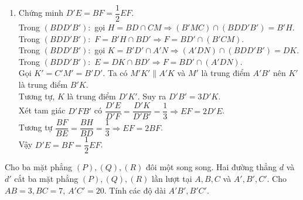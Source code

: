 \begin{bt}
{\begin{enumerate}
{
			}
			\item Chứng minh $D'E=BF=\dfrac{1}{2}EF$.\\
			Trong $(BDD'B')\colon$ gọi $H=BD\cap CM\Rightarrow (B'MC)\cap (BDD'B')=B'H$.\\
			Trong $(BDD'B')\colon$ $F=B'H\cap BD'\Rightarrow F=BD'\cap (B'CM)$.\\
			Trong $(BDD'B')\colon$ gọi $K=B'D'\cap A'N\Rightarrow (A'DN)\cap (BDD'B')=DK$.\\
			Trong $(BDD'B')\colon$ $E=DK\cap BD'\Rightarrow F=BD'\cap (A'DN)$.\\
			Gọi $K'=C'M'=B'D'$. Ta có $M'K'\parallel A'K$ và $M'$ là trung điểm $A'B'$ nên $K'$ là trung điểm $B'K$.\\
			Tương tự, $K$ là trung điểm $D'K'$. Suy ra $D'B'=3D'K$.\\
			Xét tam giác $D'FB'$ có $\dfrac{D'E}{D'F}=\dfrac{D'K}{D'B'}=\dfrac{1}{3}\Rightarrow EF=2D'E$.\\
			Tương tự $\dfrac{BF}{BE}=\dfrac{BH}{BD}=\dfrac{1}{3}\Rightarrow EF=2BF$.\\
			Vậy $D'E=BF=\dfrac{1}{2}EF$.
		\end{enumerate}
	}
\end{bt}

\begin{bt}%
	Cho ba mặt phẳng $(P),(Q),(R)$ đôi một song song. Hai đường thẳng $d$ và $d'$ cắt ba mặt phẳng $(P),(Q),(R)$ lần lượt tại $A, B, C$ và $A', B', C'$. Cho $A B=3, B C=7$, $A' C'=20$. Tính các độ dài $A' B', B' C'$.
\end{bt}

